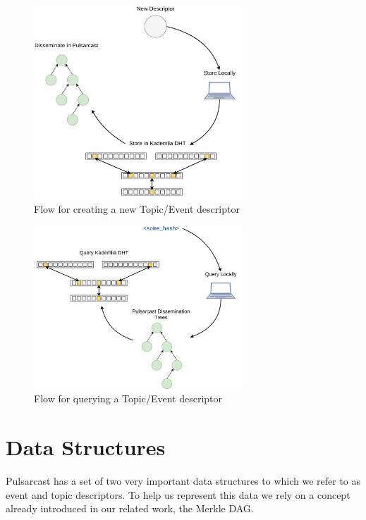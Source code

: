 \begin{figure}[hb!]
  \centering
  \includegraphics[width=0.7\textwidth]{img/pulsarcast-descriptor-creation.png}
  \caption{Flow for creating a new Topic/Event descriptor}
  \label{fig:pulsarcast-descriptor-creation}
\end{figure}

\begin{figure}[hb!]
  \centering
  \includegraphics[width=0.7\textwidth]{img/pulsarcast-descriptor-query.png}
  \caption{Flow for querying a Topic/Event descriptor}
  \label{fig:pulsarcast-descriptor-query}
\end{figure}

\section{Data Structures}\label{data-structures}

Pulsarcast has a set of two very important data structures to which we refer to
as event and topic descriptors. To help us represent this data we rely on a
concept already introduced in our related work, the Merkle DAG.

